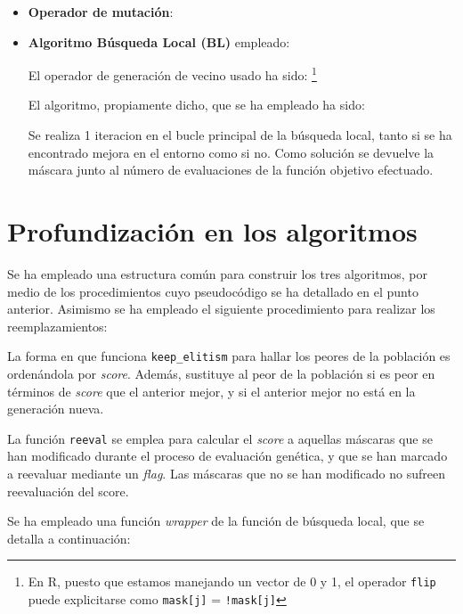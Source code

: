 \documentclass[a4paper,11pt]{article}
\begin{document}
\begin{itemize}
\item \textbf{Operador de mutación}:

  \small\texttt{}
  \normalsize
  

\item \textbf{Algoritmo Búsqueda Local (BL)} empleado:
  
  El operador de generación de vecino usado ha sido:
  \footnote{En R, puesto que estamos manejando un vector de 0 y 1, el operador \texttt{flip} puede explicitarse como
  \texttt{mask[j]} = \texttt{!mask[j]}}
  
  \small\texttt{}
  \normalsize
     
  El algoritmo, propiamente dicho, que se ha empleado ha sido:\\
  
  \small\texttt{}
  \normalsize
  
  Se realiza 1 iteracion en el bucle principal de la búsqueda local, tanto si se ha encontrado mejora en el entorno como
  si no. Como solución se devuelve la máscara junto al número de evaluaciones de la función objetivo efectuado.

\end{itemize}

\section{Profundización en los algoritmos}

Se ha empleado una estructura común para construir los tres algoritmos, por medio de los procedimientos cuyo pseudocódigo se
ha detallado en el punto anterior. Asimismo se ha empleado el siguiente procedimiento para realizar los reemplazamientos:

\small{\texttt{}}
\normalsize

La forma en que funciona \texttt{keep\_elitism} para hallar los peores de la población es ordenándola por \textit{score}.
Además, sustituye al peor de la población si es peor en términos de \textit{score} que el anterior mejor, y si el anterior
mejor no está en la generación nueva.

La función \texttt{reeval} se emplea para calcular el \textit{score} a aquellas máscaras que se han modificado durante
el proceso de evaluación genética, y que se han marcado a reevaluar mediante un \textit{flag}. Las máscaras que no se han
modificado no sufreen reevaluación del score.


Se ha empleado una función \textit{wrapper} de la función de búsqueda local, que se detalla a continuación:
\end{document}
